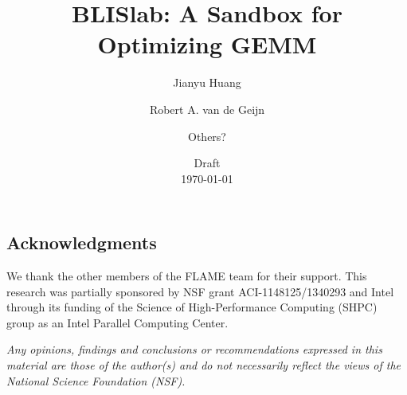 \documentclass{article}
\begin{document}
\title{
BLISlab: A Sandbox for Optimizing GEMM
}

\author{
Jianyu Huang
\and
Robert A. van de Geijn
\and
Others?
}

\date{Draft \\ \today}

\maketitle 


\begin{abstract}

\end{abstract}








\subsection*{Acknowledgments}
We thank the other members of the FLAME team for their support.
This research was partially sponsored by NSF grant ACI-1148125/1340293 and Intel through its funding of the Science of High-Performance Computing (SHPC) group as an Intel Parallel Computing Center.

{\em Any opinions, findings and conclusions or recommendations
expressed in this material are those of the author(s) and do not
necessarily reflect the views of the National Science Foundation
(NSF).}


 

\end{document}
